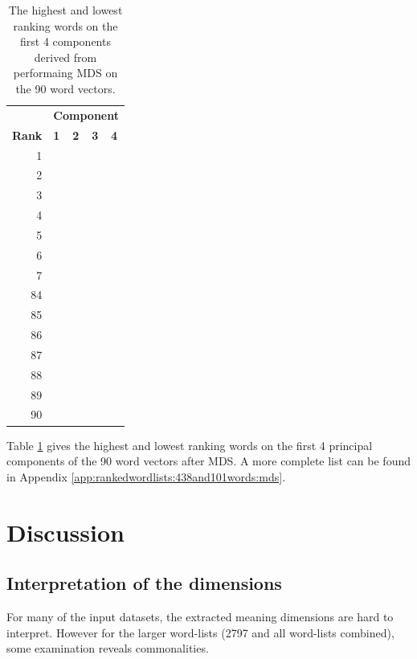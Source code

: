 \documentclass[10pt,letterpaper]{book}
\begin{document}
\begin{table}[!htbp]
    \begin{tabular}{| rllll | }
        \hline
         & \multicolumn{4}{c|}{\textbf{Component}} \\
        \textbf{Rank} & \textbf{1} & \textbf{2} & \textbf{3} & \textbf{4} \\
        \hline
        1 &  &  &  &  \\
        2 &  &  &  &  \\
        3 &  &  &  &  \\
        4 &  &  &  &  \\
        5 &  &  &  &  \\
        6 &  &  &  &  \\
        7 &  &  &  &  \\
        \hline
        84 &  &  &  &  \\
        85 &  &  &  &  \\
        86 &  &  &  &  \\
        87 &  &  &  &  \\
        88 &  &  &  &  \\
        89 &  &  &  &  \\
        90 &  &  &  &  \\
        \hline
    \end{tabular}
    \caption{The highest and lowest ranking words on the first 4 components 
    derived from performaing MDS on the 90 word vectors.}
    \label{tab:438and101wordsRankingsMDS}
\end{table}

Table \ref{tab:438and101wordsRankingsMDS} gives the highest and lowest
ranking words on the first 4 principal components of the 90 word 
vectors after MDS. A more complete list can be found in Appendix 
\ref{app:rankedwordlists:438and101words:mds}.


\chapter{Discussion}

\section{Interpretation of the dimensions}

For many of the input datasets, the extracted meaning dimensions are hard to 
interpret. However for the larger word-lists (2797 and all word-lists 
combined), some examination reveals commonalities. 
\end{document}
